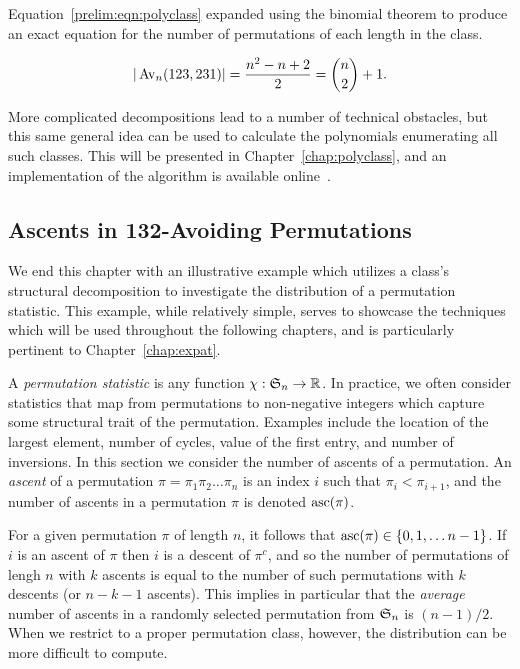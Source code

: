     Equation~\ref{prelim:eqn:polyclass} expanded using the binomial theorem to
    produce an exact equation for the number of permutations of each length in
    the class. 

    $$ | \Av_n (123, 231) | = \frac{n^2 - n + 2}{2} = \binom{n}{2} + 1.$$

    More complicated decompositions lead to a number of technical obstacles, but
    this same general idea can be used to calculate the polynomials enumerating all
    such classes. This will be presented in Chapter~\ref{chap:polyclass}, and
    an implementation of the algorithm is available
    online~\cite{polyclass-algo}. 

  \subsection{Ascents in 132-Avoiding Permutations}
  \label{prelim:sec:ascents-example}
  
    We end this chapter with an illustrative example which utilizes a class's
    structural decomposition to investigate the distribution of a permutation
    statistic. This example, while relatively simple, serves to showcase the
    techniques which will be used throughout the following chapters, and
    is particularly pertinent to Chapter~\ref{chap:expat}.
    
 
    A \emph{permutation statistic} is any function $\chi: \S_n \ra \bR$. In
    practice, we often consider statistics that map from permutations to
    non-negative integers which capture some structural trait of the
    permutation. Examples include the location of the largest element, number
    of cycles, value of the first entry, and number of inversions. In this
    section we consider the number of ascents of a permutation. An
    \emph{ascent} of a permutation $\pi = \pi_1 \pi_2 \dots \pi_n$ is an index
    $i$ such that $\pi_i < \pi_{i+1}$, and the number of ascents in a
    permutation $\pi$ is denoted $\asc(\pi)$. 


    For a given permutation $\pi$ of length $n$, it follows that $\asc(\pi) \in \{0, 1,
    \dots n-1\}$. If $i$ is an ascent of $\pi$ then $i$ is a descent of
    $\pi^c$, and so the number of permutations of lengh $n$ with $k$ ascents is equal to
    the number of such permutations with $k$ descents (or $n - k - 1$ ascents).
    This implies in particular that the \emph{average} number of ascents in a
    randomly selected permutation from $\S_n$ is $(n-1)/2$. When we restrict to a
    proper permutation class, however, the distribution can be more difficult
    to compute. 

